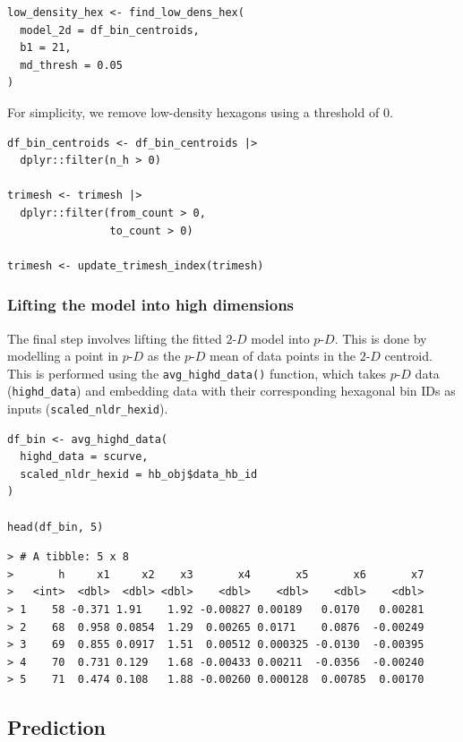 \begin{verbatim}
low_density_hex <- find_low_dens_hex(
  model_2d = df_bin_centroids, 
  b1 = 21, 
  md_thresh = 0.05
)
\end{verbatim}

For simplicity, we remove low-density hexagons using a threshold of \(0\).

\begin{verbatim}
df_bin_centroids <- df_bin_centroids |>
  dplyr::filter(n_h > 0)

trimesh <- trimesh |>
  dplyr::filter(from_count > 0,
                to_count > 0)

trimesh <- update_trimesh_index(trimesh)
\end{verbatim}

\subsubsection{Lifting the model into high dimensions}\label{lifting-the-model-into-high-dimensions}

The final step involves lifting the fitted \(2\text{-}D\) model into \(p\text{-}D\). This is done by modelling a point in \(p\text{-}D\) as the \(p\text{-}D\) mean of data points in the \(2\text{-}D\) centroid. This is performed using the \texttt{avg\_highd\_data()} function, which takes \(p\text{-}D\) data (\texttt{highd\_data}) and embedding data with their corresponding hexagonal bin IDs as inputs (\texttt{scaled\_nldr\_hexid}).

\begin{verbatim}
df_bin <- avg_highd_data(
  highd_data = scurve, 
  scaled_nldr_hexid = hb_obj$data_hb_id
)

head(df_bin, 5)
\end{verbatim}

\begin{verbatim}
> # A tibble: 5 x 8
>       h     x1     x2    x3       x4       x5       x6       x7
>   <int>  <dbl>  <dbl> <dbl>    <dbl>    <dbl>    <dbl>    <dbl>
> 1    58 -0.371 1.91    1.92 -0.00827 0.00189   0.0170   0.00281
> 2    68  0.958 0.0854  1.29  0.00265 0.0171    0.0876  -0.00249
> 3    69  0.855 0.0917  1.51  0.00512 0.000325 -0.0130  -0.00395
> 4    70  0.731 0.129   1.68 -0.00433 0.00211  -0.0356  -0.00240
> 5    71  0.474 0.108   1.88 -0.00260 0.000128  0.00785  0.00170
\end{verbatim}

\subsection{Prediction}\label{prediction}

